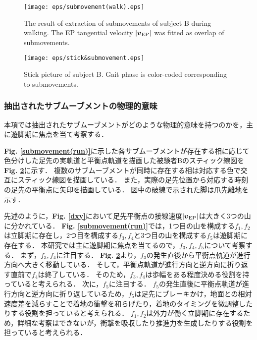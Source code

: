 %
\begin{figure}[!t]
 \begin{center}
  \texttt{[image: eps/submovement(walk).eps]}
  \caption{The result of extraction of submovements of subject B during walking. The EP tangential velocity $|\mbox{\boldmath $v$}_{\rm EP}|$ was fitted as overlap of submovements.}
  \label{submovement(walk)}
 \end{center}
\end{figure}
%
\begin{figure}[!t]
 \begin{center}
  \texttt{[image: eps/stick\&submovement.eps]}
  \caption{Stick picture of subject B. Gait phase is color-coded corresponding to submovements.}
  \label{stick&submovement}
 \end{center}
\end{figure}
%
\subsubsection{抽出されたサブムーブメントの物理的意味}
本項では抽出されたサブムーブメントがどのような物理的意味を持つのかを，主に遊脚期に焦点を当て考察する．

{\bf Fig. \ref{submovement(run)}}に示した各サブムーブメントが存在する相に応じて色分けした足先の実軌道と平衡点軌道を描画した被験者Bのスティック線図を{\bf Fig. \ref{stick&submovement}}に示す．
複数のサブムーブメントが同時に存在する相は対応する色で交互にスティック線図を描画している．
また，実際の足先位置から対応する時刻の足先の平衡点に矢印を描画している．
図中の破線で示された脚は爪先離地を示す．

先述のように，{\bf Fig. \ref{dxy}}において足先平衡点の接線速度$|\mbox{\boldmath $v$}_{\rm EP}|$は大きく3つの山に分かれている．
{\bf Fig. \ref{submovement(run)}}では，1つ目の山を構成する$f_1,f_2$は立脚期に存在し，2つ目を構成する$f_3,f_4$と3つ目の山を構成する$f_5$は遊脚期に存在する．
本研究では主に遊脚期に焦点を当てるので，$f_3,f_4,f_5$について考察する．
まず，$f_3,f_4$に注目する．
{\bf Fig. \ref{stick&submovement}}より，$f_3$の発生直後から平衡点軌道が進行方向へ大きく移動している．
そして，平衡点軌道が進行方向と逆方向に折り返す直前で$f_4$は終了している．
そのため，$f_3,f_4$は歩幅をある程度決める役割を持っていると考えられる．
次に，$f_5$に注目する．
$f_5$の発生直後に平衡点軌道が進行方向と逆方向に折り返しているため，$f_5$は足先にブレーキかけ，地面との相対速度差を減らすことで着地の衝撃を和らげたり，着地のタイミングを微調整したりする役割を担っていると考えられる．
$f_1,f_2$は外力が働く立脚期に存在するため，詳細な考察はできないが，衝撃を吸収したり推進力を生成したりする役割を担っていると考えられる．

